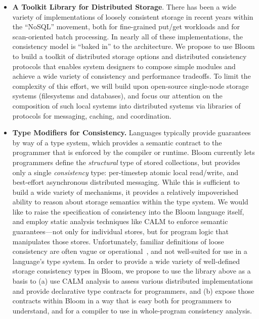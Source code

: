 \begin{itemize}
\item \textbf{A Toolkit Library for Distributed Storage}.  There has been a wide
  variety of implementations of loosely consistent storage in recent years within the ``NoSQL'' movement, both for fine-grained put/get workloads and for scan-oriented batch processing.  In nearly all of these implementations, the consistency model is ``baked in'' to the architecture.  We propose to use Bloom to build a toolkit of distributed storage options and distributed consistency protocols that enables system designers to compose simple modules and achieve a wide variety of consistency and performance tradeoffs.  To limit the complexity of this effort, we will build upon open-source single-node storage systems (filesystems and databases), and focus our attention on the composition of such local systems into distributed systems via libraries of protocols for messaging, caching, and coordination.

\item \textbf{Type Modifiers for Consistency.}  Languages typically provide guarantees by way of a type system, which provides a semantic contract to the programmer that is enforced by the compiler or runtime. Bloom currently lets programmers define the \emph{structural} type of stored collections, but provides only a single \emph{consistency} type: per-timestep atomic local read/write, and best-effort asynchronous distributed messaging.  While this is sufficient to build a wide variety of mechanisms, it provides a relatively impoverished ability to reason about storage semantics within the type system.
We would like to raise the specification of consistency into the Bloom language itself, and employ static analysis techniques like CALM to enforce semantic guarantees---not only for individual stores, but for program logic that manipulates those stores.  Unfortunately, familiar definitions of loose consistency are often vague or operational~\cite{bayou,Vogels}, and not well-suited for use in a language's type system.  In order to provide a wide variety of well-defined storage consistency types in Bloom, we propose to use the library above as a basis to (a) use CALM analysis to assess various distributed implementations and provide declarative type contracts for programmers, and (b) expose those contracts within Bloom in a way that is easy both for programmers to understand, and for a compiler to use in whole-program consistency analysis.


\end{itemize}
